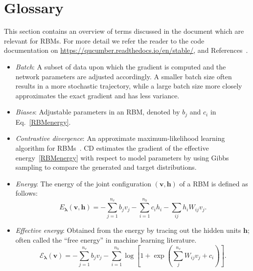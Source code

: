 \documentclass[submission, Phys, hidelnks]{SciPost}
\begin{document}
\appendix

\section{Glossary}\label{Glossary}
This section contains an overview of terms discussed in the document which are
relevant for RBMs. For more detail we refer the reader to the code documentation
on \url{https://qucumber.readthedocs.io/en/stable/}, and
References~\cite{hinton_training_2002, hinton2012practical}.

\begin{itemize}

\item \textit{Batch}: A subset of data upon which the gradient is computed and
the network parameters are adjusted accordingly. A smaller batch size often
results in a more stochastic trajectory, while a large batch size more closely
approximates the exact gradient and has less variance.

\item \textit{Biases}: Adjustable parameters in an RBM, denoted by $b_j$ and
$c_i$ in Eq.~\eqref{RBMenergy}.

\item \textit{Contrastive divergence}: An approximate maximum-likelihood
learning algorithm for RBMs~\cite{hinton_training_2002}. CD estimates the
gradient of the effective energy~\eqref{RBMenergy} with respect to model
parameters by using Gibbs sampling to compare the generated and target
distributions.

\item \textit{Energy}: The energy of the joint configuration $(\bm{v}, \bm{h})$
of a RBM is defined as follows:
\begin{equation}
   E_{\bm{\lambda}}(\bm{v},\bm{h}) = - \sum\limits_{j=1}^{n_v} b_j v_j - \sum\limits_{i=1}^{n_h} c_i h_i - \sum\limits_{ij} h_i W_{ij} v_j. \label{RBMenergy}
\end{equation}

\item \textit{Effective energy}: Obtained from the energy by tracing out the
hidden units $\bm{h}$; often called the ``free energy'' in machine learning
literature.
\begin{equation}
   \mathcal{E}_{\bm{\lambda}}(\bm{v}) = - \sum\limits_{j=1}^{n_v} b_j v_j - \sum\limits_{i=1}^{n_h} \log \left[ 1 + \exp \left( \sum\limits_{j}^{n_v} W_{ij}v_j +c_i\right) \right]. \label{RBMeffectiveenergy}
\end{equation}


\end{itemize}
\end{document}
